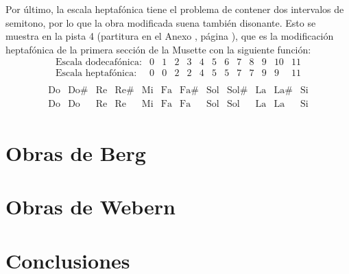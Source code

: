    	Por último, la escala heptafónica tiene el problema de contener dos intervalos de semitono, por lo que la obra modificada suena también disonante. Esto se muestra en la pista 4 (partitura en el Anexo , página ), que es la modificación heptafónica de la primera sección de la Musette con la siguiente función:
   	$$\left.\begin{matrix}\text{Escala dodecafónica:}&0&1&2&3&4&5&6&7&8&9&10&11\\\text{Escala heptafónica:}&0&0&2&2&4&5&5&7&7&9&9&11\\\end{matrix}\right.$$
   	$$\left.\begin{matrix}\text{Do}&\text{Do\#}&\text{Re}&\text{Re\#}&\text{Mi}&\text{Fa}&\text{Fa\#}&\text{Sol}&\text{Sol\#}&\text{La}&\text{La\#}&\text{Si}\\\text{Do}&\text{Do}&\text{Re}&\text{Re}&\text{Mi}&\text{Fa}&\text{Fa}&\text{Sol}&\text{Sol}&\text{La}&\text{La}&\text{Si}\\\end{matrix}\right.$$	
   
    \section{Obras de Berg}
    \section{Obras de Webern}
    \section{Conclusiones}